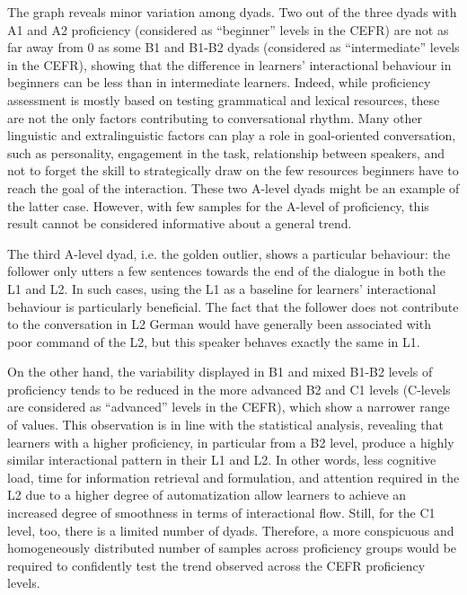 \begin{styleStandard}
The graph reveals minor variation among dyads. Two out of the three dyads with A1 and A2 proficiency (considered as “beginner” levels in the CEFR) are not as far away from 0 as some B1 and B1-B2 dyads (considered as “intermediate” levels in the CEFR), showing that the difference in learners’ interactional behaviour in beginners can be less than in intermediate learners. Indeed, while proficiency assessment is mostly based on testing grammatical and lexical resources, these are not the only factors contributing to conversational rhythm. Many other linguistic and extralinguistic factors can play a role in goal-oriented conversation, such as personality, engagement in the task, relationship between speakers, and not to forget the skill to strategically draw on the few resources beginners have to reach the goal of the interaction. These two A-level dyads might be an example of the latter case. However, with few samples for the A-level of proficiency, this result cannot be considered informative about a general trend.
\end{styleStandard}

\begin{styleStandard}
The third A-level dyad, i.e. the golden outlier, shows a particular behaviour: the follower only utters a few sentences towards the end of the dialogue in both the L1 and L2. In such cases, using the L1 as a baseline for learners’ interactional behaviour is particularly beneficial. The fact that the follower does not contribute to the conversation in L2 German would have generally been associated with poor command of the L2, but this speaker behaves exactly the same in L1.
\end{styleStandard}

\begin{styleStandard}
On the other hand, the variability displayed in B1 and mixed B1-B2 levels of proficiency tends to be reduced in the more advanced B2 and C1 levels (C-levels are considered as “advanced” levels in the CEFR), which show a narrower range of values. This observation is in line with the statistical analysis, revealing that learners with a higher proficiency, in particular from a B2 level, produce a highly similar interactional pattern in their L1 and L2. In other words, less cognitive load, time for information retrieval and formulation, and attention required in the L2 due to a higher degree of automatization allow learners to achieve an increased degree of smoothness in terms of interactional flow. Still, for the C1 level, too, there is a limited number of dyads. Therefore, a more conspicuous and homogeneously distributed number of samples across proficiency groups would be required to confidently test the trend observed across the CEFR proficiency levels.
\end{styleStandard}

